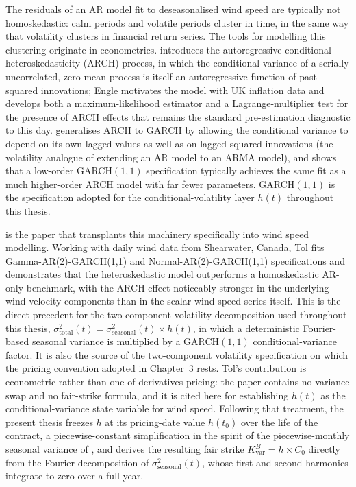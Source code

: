 \documentclass[11pt, a4paper, twoside]{article}
\begin{document}
The residuals of an AR model fit to deseasonalised wind speed are typically not homoskedastic: calm periods and volatile periods cluster in time, in the same way that volatility clusters in financial return series. The tools for modelling this clustering originate in econometrics. \citet{Engle1982} introduces the autoregressive conditional heteroskedasticity (ARCH) process, in which the conditional variance of a serially uncorrelated, zero-mean process is itself an autoregressive function of past squared innovations; Engle motivates the model with UK inflation data and develops both a maximum-likelihood estimator and a Lagrange-multiplier test for the presence of ARCH effects that remains the standard pre-estimation diagnostic to this day. \citet{Bollerslev1986} generalises ARCH to GARCH by allowing the conditional variance to depend on its own lagged values as well as on lagged squared innovations (the volatility analogue of extending an AR model to an ARMA model), and shows that a low-order GARCH$(1,1)$ specification typically achieves the same fit as a much higher-order ARCH model with far fewer parameters. GARCH$(1,1)$ is the specification adopted for the conditional-volatility layer $h(t)$ throughout this thesis.

\citet{Tol1997} is the paper that transplants this machinery specifically into wind speed modelling. Working with daily wind data from Shearwater, Canada, Tol fits Gamma-AR(2)-GARCH(1,1) and Normal-AR(2)-GARCH(1,1) specifications and demonstrates that the heteroskedastic model outperforms a homoskedastic AR-only benchmark, with the ARCH effect noticeably stronger in the underlying wind velocity components than in the scalar wind speed series itself. This is the direct precedent for the two-component volatility decomposition used throughout this thesis, $\sigma^2_{\text{total}}(t) = \sigma^2_{\text{seasonal}}(t) \times h(t)$, in which a deterministic Fourier-based seasonal variance is multiplied by a GARCH$(1,1)$ conditional-variance factor. It is also the source of the two-component volatility specification on which the pricing convention adopted in Chapter~3 rests. Tol's contribution is econometric rather than one of derivatives pricing: the paper contains no variance swap and no fair-strike formula, and it is cited here for establishing $h(t)$ as the conditional-variance state variable for wind speed. Following that treatment, the present thesis freezes $h$ at its pricing-date value $h(t_0)$ over the life of the contract, a piecewise-constant simplification in the spirit of the piecewise-monthly seasonal variance of \citet{AlatonEtAl2002}, and derives the resulting fair strike $K_{\text{var}}^B = h \times C_0$ directly from the Fourier decomposition of $\sigma^2_{\text{seasonal}}(t)$, whose first and second harmonics integrate to zero over a full year.
\end{document}
